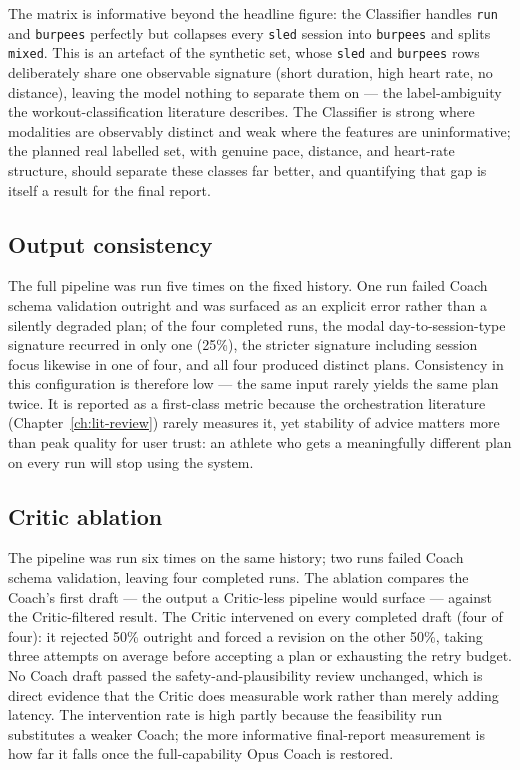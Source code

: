 The matrix is informative beyond the headline figure: the Classifier handles \texttt{run} and \texttt{burpees} perfectly but collapses every \texttt{sled} session into \texttt{burpees} and splits \texttt{mixed}. This is an artefact of the synthetic set, whose \texttt{sled} and \texttt{burpees} rows deliberately share one observable signature (short duration, high heart rate, no distance), leaving the model nothing to separate them on --- the label-ambiguity the workout-classification literature describes. The Classifier is strong where modalities are observably distinct and weak where the features are uninformative; the planned real labelled set, with genuine pace, distance, and heart-rate structure, should separate these classes far better, and quantifying that gap is itself a result for the final report.

\subsection{Output consistency}

The full pipeline was run five times on the fixed history. One run failed Coach schema validation outright and was surfaced as an explicit error rather than a silently degraded plan; of the four completed runs, the modal day-to-session-type signature recurred in only one (25\%), the stricter signature including session focus likewise in one of four, and all four produced distinct plans. Consistency in this configuration is therefore low --- the same input rarely yields the same plan twice. It is reported as a first-class metric because the orchestration literature (Chapter~\ref{ch:lit-review}) rarely measures it, yet stability of advice matters more than peak quality for user trust: an athlete who gets a meaningfully different plan on every run will stop using the system.

\subsection{Critic ablation}

The pipeline was run six times on the same history; two runs failed Coach schema validation, leaving four completed runs. The ablation compares the Coach's first draft --- the output a Critic-less pipeline would surface --- against the Critic-filtered result. The Critic intervened on every completed draft (four of four): it rejected 50\% outright and forced a revision on the other 50\%, taking three attempts on average before accepting a plan or exhausting the retry budget. No Coach draft passed the safety-and-plausibility review unchanged, which is direct evidence that the Critic does measurable work rather than merely adding latency. The intervention rate is high partly because the feasibility run substitutes a weaker Coach; the more informative final-report measurement is how far it falls once the full-capability Opus Coach is restored.

